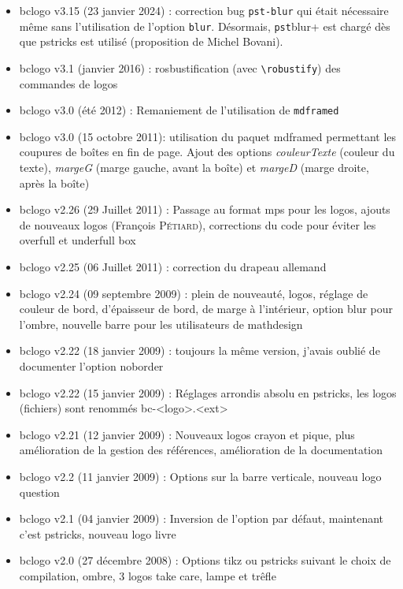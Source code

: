 \documentclass[a4paper,10pt,frenchb]{article}
\begin{document}
\begin{itemize}
  \item bclogo v3.15 (23 janvier 2024) : correction bug \verb+pst-blur+ 
    qui était nécessaire même sans l'utilisation de l'option 
    \verb+blur+. Désormais, \verb-pst-blur+ est chargé dès que pstricks est
    utilisé (proposition de Michel Bovani).
  \item bclogo v3.1 (janvier 2016) : rosbustification (avec
    \verb+\robustify+) des commandes de logos
  \item bclogo v3.0 (été 2012) : Remaniement de l'utilisation de
    \verb+mdframed+
  \item bclogo v3.0 (15 octobre 2011): utilisation du paquet mdframed
    permettant les coupures de boîtes en fin de page. Ajout des
    options \emph{couleurTexte} (couleur du texte), \emph{margeG}
    (marge gauche, avant la boîte) et \emph{margeD} (marge droite,
    après la boîte)
  \item bclogo v2.26 (29 Juillet 2011) : Passage au format mps pour
    les logos, ajouts de nouveaux logos (François \textsc{Pétiard}),
    corrections du code pour éviter les overfull et underfull box
  \item bclogo v2.25 (06 Juillet 2011) : correction du drapeau
    allemand
  \item bclogo v2.24 (09 septembre 2009) : plein de nouveauté, logos,
    réglage de couleur de bord, d'épaisseur de bord, de marge à
    l'intérieur, option blur pour l'ombre, nouvelle barre pour les
    utilisateurs de mathdesign
  \item bclogo v2.22 (18 janvier 2009) : toujours la même version,
    j'avais oublié de documenter l'option noborder
  \item bclogo v2.22 (15 janvier 2009) : Réglages arrondis absolu en
    pstricks, les logos (fichiers) sont renommés bc-<logo>.<ext>
  \item bclogo v2.21 (12 janvier 2009) : Nouveaux logos crayon et
    pique, plus amélioration de la gestion des références,
    amélioration de la documentation
  \item bclogo v2.2 (11 janvier 2009) : Options sur la barre
    verticale, nouveau logo question
  \item bclogo v2.1 (04 janvier 2009) : Inversion de l'option par
    défaut, maintenant c'est pstricks, nouveau logo livre
  \item bclogo v2.0 (27 décembre 2008) : Options tikz ou pstricks
    suivant le choix de compilation, ombre, 3 logos take care, lampe
    et trêfle

\end{itemize}
\end{document}
